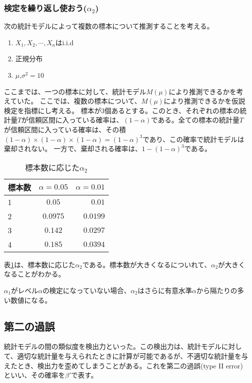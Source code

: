 \documentclass[a4paper,11pt,dvipdfmx]{jsarticle}
\begin{document}
\subsubsection{検定を繰り返し使おう($\alpha_2$)}
次の統計モデルによって複数の標本について推測することを考える。
\begin{enumerate}
    \item $X_1,X_2,\cdots,X_n $はi.i.d
    \item 正規分布
    \item $\mu$,$\sigma^2=10$
\end{enumerate}
ここまでは、一つの標本に対して、統計モデル$M(\mu)$により推測できるかを考えていた。
ここでは、複数の標本について、$M(\mu)$により推測できるかを仮説検定を指標にし考える。
標本が$3$個あるとする。このとき、それぞれの標本の統計量$T$が信頼区間に入っている確率は、$(1-\alpha)$である。全ての標本の統計量$T$が信頼区間に入っている確率は、その積$(1-\alpha)\times(1-\alpha)\times(1-\alpha)=(1-\alpha)^3$であり、この確率で統計モデルは棄却されない。
一方で、棄却される確率は、$1-(1-\alpha)^3$である。
\begin{table}[hbtp]
    \caption{標本数に応じた$\alpha_2$}
    \label{table:multiple_test_reject_prob}
    \centering
    \begin{tabular}{lcr}
      \hline
      標本数  & $\alpha=0.05$  &  $\alpha=0.01$ \\
      \hline \hline
       1 & $0.05$  & $0.01$ \\
       2 & $0.0975$ & $0.0199$\\
       3 & $0.142$ & $0.0297$\\
       4 & $0.185$ & $0.0394$\\
    \end{tabular}
  \end{table}
表\ref{table:multiple_test_reject_prob}は、標本数に応じた$\alpha_2$である。標本数が大きくなるについれて、$\alpha_2$が大きくなることがわかる。

$\alpha_1$がレベル$\alpha$の検定になっていない場合、$\alpha_2$はさらに有意水準$\alpha$から隔たりの多い数値になる。




\subsection{第二の過誤}
統計モデルの間の類似度を検出力といった。この検出力は、統計モデルに対して、適切な統計量を与えられたときに計算が可能であるが、不適切な統計量を与えたとき、検出力を歪めてしまうことがある。これを第二の過誤(type II error)といい、その確率を$\beta'$で表す。
\end{document}
